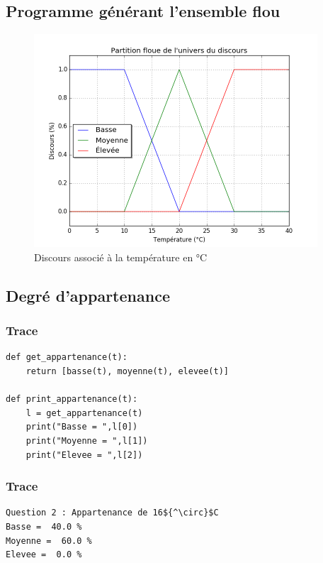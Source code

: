 \documentclass[a4paper]{article}
\begin{document}
\subsection{Programme générant l'ensemble flou}
\begin{figure}[h]
\begin{center}
	\includegraphics[width=400px]{plot_3.png}
\end{center}
\caption{Discours associé à la température en °C}
\end{figure}

\subsection{Degré d'appartenance}

\subsubsection{Trace}
\begin{lstlisting}
def get_appartenance(t):
    return [basse(t), moyenne(t), elevee(t)]

def print_appartenance(t):
    l = get_appartenance(t)
    print("Basse = ",l[0])
    print("Moyenne = ",l[1])
    print("Elevee = ",l[2])
\end{lstlisting}

\subsubsection{Trace}
\begin{lstlisting}[mathescape]
Question 2 : Appartenance de 16${^\circ}$C
Basse =  40.0 %
Moyenne =  60.0 %
Elevee =  0.0 %
\end{lstlisting}
\end{document}

